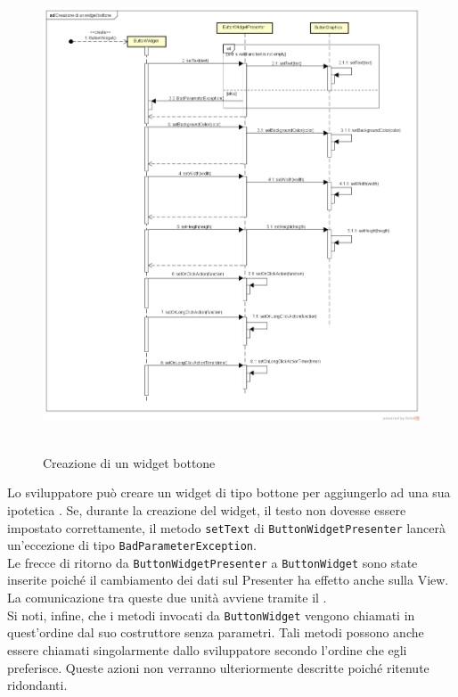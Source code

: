 \label{Creazione di un widget bottone}
\begin{figure}[ht]
	\centering
	\includegraphics[width=16cm, height=14cm]{Sezioni/Diagrammi/img/Creazione di un widget bottone.png}
	\caption{Creazione di un widget bottone}
\end{figure}

Lo sviluppatore può creare un widget di tipo bottone per aggiungerlo ad una sua ipotetica . Se, durante la creazione del widget, il testo non dovesse essere impostato correttamente, il metodo \texttt{setText} di \texttt{ButtonWidgetPresenter} lancerà un'eccezione di tipo \texttt{BadParameterException}. \\
Le frecce di ritorno da \texttt{ButtonWidgetPresenter}  a \texttt{ButtonWidget} sono state inserite poiché il cambiamento dei dati sul Presenter ha effetto anche sulla View. La comunicazione tra queste due unità avviene tramite il  . \\
Si noti, infine, che i metodi invocati da \texttt{ButtonWidget} vengono chiamati in quest'ordine dal suo costruttore senza parametri. Tali metodi possono anche essere chiamati singolarmente dallo sviluppatore secondo l'ordine che egli preferisce. Queste azioni non verranno ulteriormente descritte poiché ritenute ridondanti.


